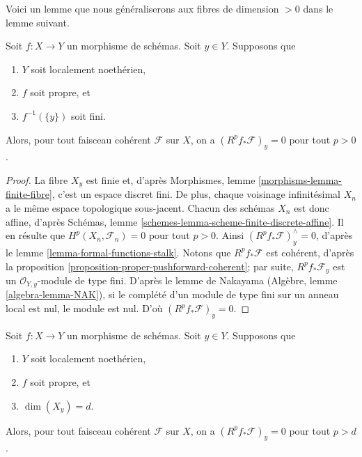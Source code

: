 \noindent
Voici un lemme que nous généraliserons aux fibres de
dimension $ > 0$ dans le lemme suivant.

\begin{lemma}
\label{lemma-higher-direct-images-zero-finite-fibre}
Soit $f : X \to Y$ un morphisme de schémas.
Soit $y \in Y$. Supposons
que
\begin{enumerate}
\item $Y$ soit localement noethérien,
\item $f$ soit propre, et
\item $f^{-1}(\{y\})$ soit fini.
\end{enumerate}
Alors, pour tout faisceau cohérent $\mathcal{F}$ sur $X$, on a
$(R^pf_*\mathcal{F})_y = 0$ pour tout $p > 0$.
\end{lemma}

\begin{proof}
La fibre $X_y$ est finie et, d'après
Morphismes, lemme \ref{morphisms-lemma-finite-fibre},
c'est un espace discret fini. De
plus, chaque voisinage infinitésimal $X_n$ a le même
espace topologique sous-jacent. Chacun des schémas $X_n$ est donc affine, d'après
Schémas, lemme \ref{schemes-lemma-scheme-finite-discrete-affine}.
Il en résulte que $H^p(X_n, \mathcal{F}_n) = 0$ pour tout
$p > 0$. Ainsi $(R^pf_*\mathcal{F})_y^\wedge = 0$,
d'après le lemme \ref{lemma-formal-functions-stalk}.
Notons que $R^pf_*\mathcal{F}$ est cohérent, d'après la
proposition \ref{proposition-proper-pushforward-coherent}; par
suite, $R^pf_*\mathcal{F}_y$ est un
$\mathcal{O}_{Y, y}$-module de type fini. D'après le lemme
de Nakayama (Algèbre, lemme \ref{algebra-lemma-NAK}),
si le complété d'un module de type fini sur un anneau
local est nul, le module est nul. D'où
$(R^pf_*\mathcal{F})_y = 0$.
\end{proof}

\begin{lemma}
\label{lemma-higher-direct-images-zero-above-dimension-fibre}
Soit $f : X \to Y$ un morphisme de schémas.
Soit $y \in Y$. Supposons
que
\begin{enumerate}
\item $Y$ soit localement noethérien,
\item $f$ soit propre, et
\item $\dim(X_y) = d$.
\end{enumerate}
Alors, pour tout faisceau cohérent $\mathcal{F}$ sur $X$, on a
$(R^pf_*\mathcal{F})_y = 0$ pour tout $p > d$.
\end{lemma}

